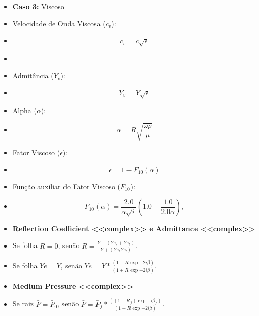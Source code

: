 \documentclass[10pt,aspectratio=169]{beamer}
\theoremstyle{remark}
\theoremstyle{definition}
\begin{document}
\begin{frame}[allowframebreaks]
\begin{itemize}
		\end{itemize}
		
		
		\framebreak
		
		\begin{itemize}
			\item \textbf{Caso 3:} Viscoso
			\item Velocidade de Onda Viscosa ($c_v$):
			\item 
					\begin{equation}
					  c_v = c\sqrt{\epsilon}
					\label{10}
					\end{equation}
			\item
			\item Admitância ($Y_v$):
			\item 
					\begin{equation}
					Y_v = Y\sqrt{\epsilon}
					\label{11}
					\end{equation}
			
		\end{itemize}
		
		\framebreak
		
		\begin{itemize}
			\item Alpha ($\alpha$):
			\item 
					\begin{equation}
					  \alpha = R \sqrt{\frac{\omega \rho}{\mu}}
					\label{12}
					\end{equation}
			\item Fator Viscoso ($\epsilon$):
			\item 
					\begin{equation}
					 \epsilon = 1 - F_{10}(\alpha)
					\label{15}
					\end{equation}
			\item Função auxiliar do Fator Viscoso ($ F_{10}$):
			\item 
					\begin{equation}
						F_{10} (\alpha) = \frac{2.0}{\alpha \sqrt{i}}(1.0+\frac{1.0}{2.0\alpha}),
						\label{14}
					\end{equation}
			
		\end{itemize}
		
		\framebreak
		
		\begin{itemize}
			\item \textbf{Reflection Coefficient <<complex>> e Admittance <<complex>>}
			\item Se folha $ R = 0 $, senão $ R = \frac{Y - (Ye_r + Ye_l)}{Y + (Ye_r Ye_l)}$.
			\item Se folha $ Ye = Y $, senão $ Ye = Y * \frac{(1 - R\exp{-2i\beta})}{(1 + R\exp{-2i\beta})}$.
			\item \textbf{Medium Pressure <<complex>>}
			\item Se raiz $ \bar{P} = \bar{P}_0 $, senão $ \bar{P} = \bar{P}_f * \frac{((1 + R_f)\exp{-i\beta_f})}{(1 + R\exp{-2i\beta})}$.
		\end{itemize}
		

\end{frame}
\end{document}
